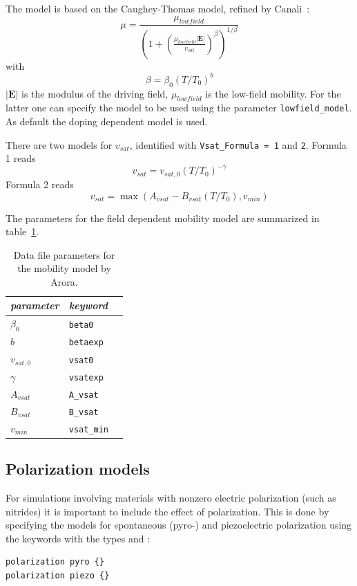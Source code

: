 The model is based on the Caughey-Thomas model, refined by Canali~\cite{canali}:
\begin{equation}
\mu = \frac{\mu_{lowfield}}{\left(1 + \left(\frac{\mu_{lowfield} |\mathbf{E}|}{v_{sat}}\right)^\beta \right)^{1/\beta}}
\end{equation}
with
\[
\beta = \beta_0(T/T_0)^b 
\]
$|\mathbf{E}|$ is the modulus of the driving field, $\mu_{lowfield}$ is the low-field mobility.
For the latter one can  specify the model to be used using the parameter \verb+lowfield_model+.
As default the doping dependent model is used.

There are two models for $v_{sat}$, identified with \verb+Vsat_Formula = 1+ and \verb+2+.
Formula 1 reads
\[
v_{sat} = v_{sat,0} (T/T_0)^{-\gamma}
\]
Formula 2 reads
\[
v_{sat} = \max(A_{vsat} - B_{vsat} (T/T_0), v_{min})
\]

The parameters for the field dependent mobility model are summarized in table~\ref{table:mobility_field_dep}.
\begin{table}[htb]
\center
\begin{tabular}{l||l|l}
\textit{parameter} & \textit{keyword} \\
\hline\hline
$\beta_0$ &  \verb+beta0+ \\
$b$ &  \verb+betaexp+ \\
$v_{sat,0}$ &  \verb+vsat0+ \\
$\gamma$ &  \verb+vsatexp+ \\
$A_{vsat}$ &  \verb+A_vsat+ \\
$B_{vsat}$ &  \verb+B_vsat+ \\
$v_{min}$ &  \verb+vsat_min+ \\
\end{tabular}
\caption{Data file parameters for the mobility model by Arora.}
\label{table:mobility_field_dep}
\end{table}


\subsection{Polarization models}
For simulations involving materials with nonzero electric polarization (such as nitrides) it is important to include the effect of polarization.
This is done by specifying the models for spontaneous (pyro-) and piezoelectric polarization using the keywords  with the types  and :
\begin{verbatim}
polarization pyro {}
polarization piezo {}
\end{verbatim}

